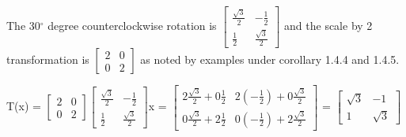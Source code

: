     \begin{tbox}
        The 30$^{\circ}$ degree counterclockwise rotation is
        $\begin{bmatrix}
            \frac{\sqrt{3}}{2} & -\frac{1}{2} \\
            \frac{1}{2} & \frac{\sqrt{3}}{2}
        \end{bmatrix}$
        and the scale by 2 transformation is
        $\begin{bmatrix}
            2 & 0 \\
            0 & 2
        \end{bmatrix}$
        as noted by examples under {\color{orange} corollary 1.4.4 and 1.4.5}.

        \hspace{0.5cm}
        T(x) =
        $\begin{bmatrix}
            2 & 0 \\
            0 & 2
        \end{bmatrix}
        \begin{bmatrix}
            \frac{\sqrt{3}}{2} & -\frac{1}{2} \\
            \frac{1}{2} & \frac{\sqrt{3}}{2}
        \end{bmatrix}$x =
        $\begin{bmatrix}
            2\frac{\sqrt{3}}{2}+0\frac{1}{2}
                & 2(-\frac{1}{2})+0\frac{\sqrt{3}}{2} \\
            0\frac{\sqrt{3}}{2}+2\frac{1}{2}
                & 0(-\frac{1}{2})+2\frac{\sqrt{3}}{2}
        \end{bmatrix}$ =
        $\begin{bmatrix}
            \sqrt{3} & -1 \\
            1 & \sqrt{3}
        \end{bmatrix}$
    \end{tbox}

    \vspace{0.5cm}




